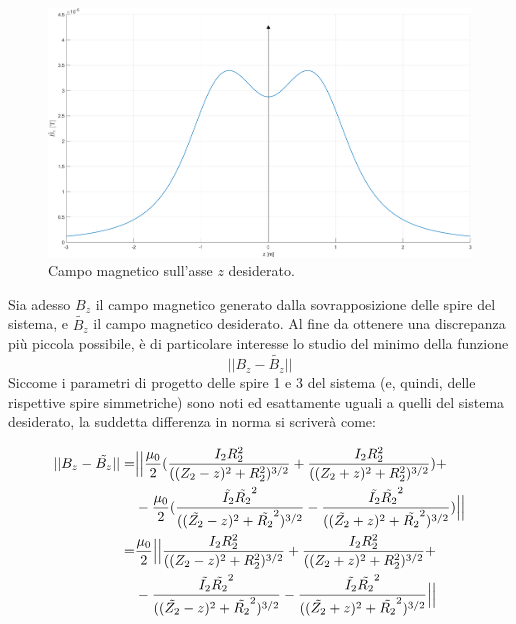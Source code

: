 \documentclass[a4paper, 11pt]{article}
\begin{document}
\begin{figure}[H]
	\centering
	\includegraphics[width=16cm]{assets/figure2}
	\caption{Campo magnetico sull'asse $z$ desiderato.}
\end{figure}
\noindent
Sia adesso $B_{z}$ il campo magnetico generato dalla sovrapposizione delle spire
del sistema, e $\tilde{B_{z}}$ il campo magnetico desiderato. Al fine da
ottenere una discrepanza più piccola possibile, è di particolare interesse lo
studio del minimo della funzione
\[||B_{z}-\tilde{B_{z}}||\] Siccome i parametri di progetto delle spire 1 e 3
del sistema (e, quindi, delle rispettive spire simmetriche) sono noti ed
esattamente uguali a quelli del sistema desiderato, la suddetta differenza in
norma si scriverà come:

\begin{equation}
	\begin{split}
		||B_{z}-\tilde{B_{z}}||
		=& \Bigl|\Bigl|\frac{\mu_{0}}{2}(\frac{I_{2}R_{2}^{2}}{((Z_{2}-z)^{2}+R_{2}^{2})^{3/2}}+\frac{I_{2}R_{2}^{2}}{((Z_{2}+z)^{2}+R_{2}^{2})^{3/2}})+ \\
		 & -\frac{\mu_{0}}{2}(\frac{\tilde{I_{2}}\tilde{R_{2}}^{2}}{((\tilde{Z_{2}}-z)^{2}+\tilde{R_{2}}^{2})^{3/2}}-\frac{\tilde{I_{2}}\tilde{R_{2}}^{2}}{((\tilde{Z_{2}}+z)^{2}+\tilde{R_{2}}^{2})^{3/2}})\Bigr|\Bigr| \\
		=& \frac{\mu_{0}}{2}\Bigl|\Bigl|\frac{I_{2}R_{2}^{2}}{((Z_{2}-z)^{2}+R_{2}^{2})^{3/2}}+\frac{I_{2}R_{2}^{2}}{((Z_{2}+z)^{2}+R_{2}^{2})^{3/2}}+ \\
		 & -\frac{\tilde{I_{2}}\tilde{R_{2}}^{2}}{((\tilde{Z_{2}}-z)^{2}+\tilde{R_{2}}^{2})^{3/2}}-\frac{\tilde{I_{2}}\tilde{R_{2}}^{2}}{((\tilde{Z_{2}}+z)^{2}+\tilde{R_{2}}^{2})^{3/2}}\Bigr|\Bigr|
	\end{split} 
\end{equation}
\noindent
\end{document}
